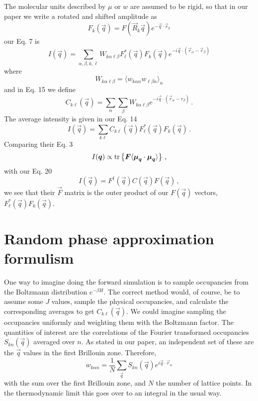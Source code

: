 \documentclass[12pt]{article}
\begin{document}
The molecular units described by $\mu$ or $w$ are
assumed to be rigid, so that in our paper we write a rotated and shifted
amplitude as
\begin{equation}
F_k(\vec q) = F(\vec R_k \vec q) e^{-\vec q\cdot \vec s_k}
\end{equation}
our Eq. 7 is
\begin{equation}
I(\vec q) = \sum_{\alpha,\beta,k,\ell} W_{k\alpha \ell \beta}
F_\ell^*(\vec q) F_k(\vec q) e^{-i\vec q \cdot (\vec r_\alpha-\vec r_\beta)}
\end{equation}
where
\begin{equation}
W_{k\alpha \ell \beta} = \langle w_{k\alpha n} w_{\ell\beta n} \rangle_n
\end{equation}
and in Eq. 15 we define
\begin{equation}
C_{k\ell}(\vec q) =\sum_\alpha\sum_\beta W_{k\alpha\ell\beta}
e^{-i \vec q \cdot (\vec r_\alpha-r_\beta)} \,.
\end{equation}
The average intensity is given in our Eq. 14
\begin{equation}
I(\vec q) = \sum_{k\ell} C_{k\ell}(\vec q) F^*_\ell(\vec q) F_k(\vec q)
\,.
\end{equation}
Comparing their Eq. 3
\begin{equation}
I(\vec q) \propto {\rm tr}
\left \{ \vec F\langle \vec \mu_{\vec q} \cdot \vec \mu_{\vec q}\rangle \right\}
\,,
\end{equation}
with our Eq. 20
\begin{equation}
I(\vec q) = F^\dagger(\vec q) C(\vec q) F(\vec q) \,,
\end{equation}
we see that their $\vec F$ matrix is the outer
product of our $ F(\vec q)$ vectors,
$F^*_\ell(\vec q) F_k(\vec q)$.

\section{Random phase approximation formulism}
One way to imagine doing the forward simulation is to sample
occupancies from the Boltzmann distribution $e^{-\beta H}$. The correct
method would, of course, be to assume some $J$ values,
sample the physical occupancies, and
calculate the corresponding averages to get $C_{k\ell}(\vec q)$.
We could imagine sampling the occupancies uniformly and weighting
them with the Boltzmann factor. The quantities of interest are the
correlations of the Fourier transformed occupancies
$S_{kn}(\vec q)$ averaged over $n$. As stated in our paper,
an independent set of these are the $\vec q$ values in the first Brillouin
zone. Therefore,
\begin{equation}
w_{k\alpha n} = \frac{1}{N} \sum_{\vec q} S_{kn}(\vec q)
e^{i\vec q \cdot \vec r_\alpha}
\end{equation}
with the sum over the first Brillouin zone, and $N$ the number of lattice
points. In the thermodynamic limit this goes over to an integral in the
usual way.
\end{document}
